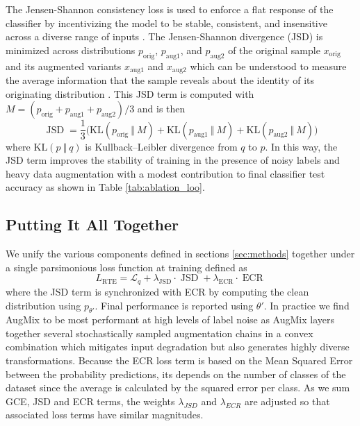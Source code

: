 \documentclass{article}
\newcommand{\KL}{D_{\mathrm{KL}}}
\renewcommand{\KL}[2]{\text{KL}(#1~\Vert~#2)}
\DeclareMathOperator{\ECR}{ECR}
\DeclareMathOperator{\JSD}{JSD}
\DeclareMathOperator{\RTE}{RTE}
\begin{document}
The Jensen-Shannon consistency loss is used to enforce a flat response of the classifier by incentivizing the model to be stable, consistent, and insensitive across a diverse range of inputs \cite{7780854}. The Jensen-Shannon divergence (JSD) is minimized across distributions $p_\text{orig}$, $p_\text{aug1}$, and $p_\text{aug2}$ of the original sample $x_\text{orig}$ and its augmented variants $x_\text{aug1}$ and $x_\text{aug2}$ which can be understood to measure the average information that the sample reveals about the identity of its originating distribution \cite{hendrycks2020augmix}.  This JSD term is computed with $M = (p_\text{orig}+p_\text{aug1}+p_\text{aug2})/3$ and is then
\begin{equation}
\label{eqn:jsd}
\JSD = \frac{1}{3}\Big(\KL{p_\text{orig}}{M} + \KL{p_\text{aug1}}{M} + \KL{p_\text{aug2}}{M}\Big)
\end{equation}
where $\KL{p}{q}$ is Kullback–Leibler divergence from $q$ to $p$.  In this way, the JSD term improves the stability of training in the presence of noisy labels and heavy data augmentation with a modest contribution to final classifier test accuracy as shown in Table \ref{tab:ablation_loo}. 


\subsection{Putting It All Together}
We unify the various components defined in sections \ref{sec:methods} together under a single parsimonious loss function at training defined as
\begin{equation}
\label{eqn:rteloss}
L_{\RTE} = \mathcal{L}_q + \lambda_{\JSD} \cdot \JSD + \lambda_{\ECR} \cdot \ECR
\end{equation}
where the JSD term is synchronized with ECR by computing the clean distribution using $p_{\theta'}$. Final performance is reported using $\theta '$.  In practice we find AugMix \cite{hendrycks2020augmix} to be most performant at high levels of label noise as AugMix layers together several stochastically sampled augmentation chains in a convex combination which mitigates input degradation but also generates highly diverse transformations.  Because the ECR loss term is based on the Mean Squared Error between the probability predictions, its depends on the number of classes of the dataset since the average is calculated by the squared error per class. As we sum GCE, JSD and ECR terms, the weights $\lambda_{JSD}$ and $\lambda_{ECR}$ are adjusted so that associated loss terms have similar magnitudes.
\end{document}
